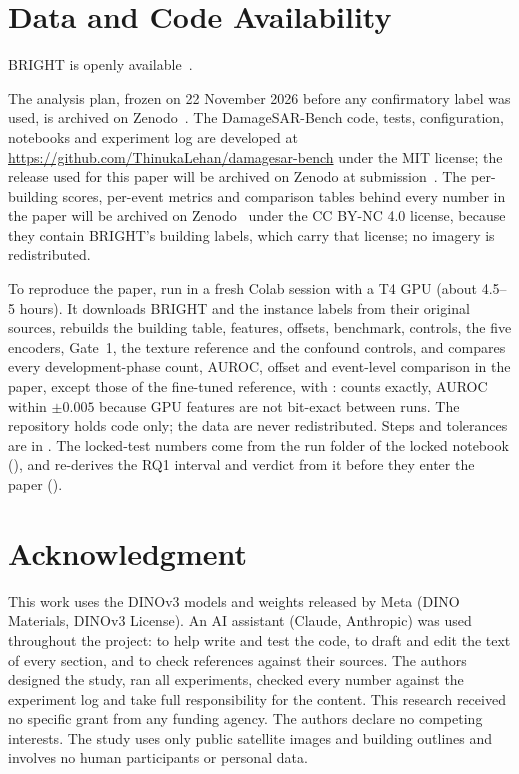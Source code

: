 \documentclass{ieeeaccess}
\begin{document}
\section*{Data and Code Availability}
\label{sec:availability}
BRIGHT is openly available~\cite{chen2025bright,chen2026brightzenodo}.

The analysis plan, frozen on 22 November 2026 before any confirmatory label was used, is archived on Zenodo~\cite{lehan2026prereg}. The DamageSAR-Bench code, tests, configuration, notebooks and experiment log are developed at \url{https://github.com/ThinukaLehan/damagesar-bench} under the MIT license; the release used for this paper will be archived on Zenodo at submission~\cite{lehan2026code}. The per-building scores, per-event metrics and comparison tables behind every number in the paper will be archived on Zenodo~\cite{lehan2026data} under the CC BY-NC 4.0 license, because they contain BRIGHT's building labels, which carry that license; no imagery is redistributed.

 To reproduce the paper, run  in a fresh Colab session with a T4 GPU (about 4.5--5 hours). It downloads BRIGHT and the instance labels from their original sources, rebuilds the building table, features, offsets, benchmark, controls, the five encoders, Gate~1, the texture reference and the confound controls, and compares every development-phase count, AUROC, offset and event-level comparison in the paper, except those of the fine-tuned reference, with : counts exactly, AUROC within $\pm0.005$ because GPU features are not bit-exact between runs. The repository holds code only; the data are never redistributed. Steps and tolerances are in . The locked-test numbers come from the run folder of the locked notebook (), and  re-derives the RQ1 interval and verdict from it before they enter the paper ().

\section*{Acknowledgment}
This work uses the DINOv3 models and weights released by Meta (DINO Materials, DINOv3 License). An AI assistant (Claude, Anthropic) was used throughout the project: to help write and test the code, to draft and edit the text of every section, and to check references against their sources. The authors designed the study, ran all experiments, checked every number against the experiment log and take full responsibility for the content. This research received no specific grant from any funding agency. The authors declare no competing interests. The study uses only public satellite images and building outlines and involves no human participants or personal data.
\end{document}
